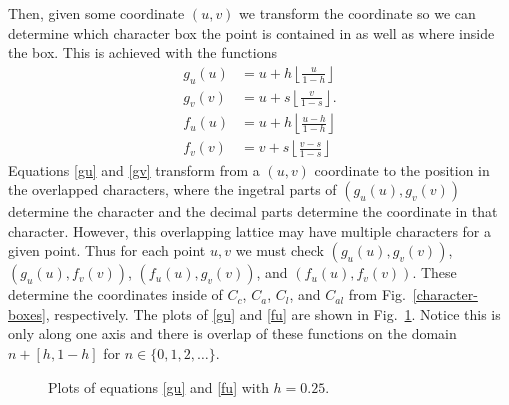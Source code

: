 \documentclass[12pt]{article}
\begin{document}
Then, given some coordinate $(u,v)$ we transform the coordinate so we can determine which character box the point is contained in as well as where inside the box. This is achieved with the functions
\begin{align}
	g_u(u) &= u + h \left\lfloor \frac{u}{1-h} \right\rfloor \label{gu} \\
	g_v(v) &= u + s \left\lfloor \frac{v}{1-s} \right\rfloor. \label{gv} \\
	f_u(u) &= u + h \left\lfloor \frac{u - h}{1-h} \right\rfloor \label{fu} \\
	f_v(v) &= v + s \left\lfloor \frac{v - s}{1-s} \right\rfloor \label{fv}
\end{align}
Equations \eqref{gu} and \eqref{gv} transform from a $(u,v)$ coordinate to the position in the overlapped characters, where the ingetral parts of $(g_u(u), g_v(v))$ determine the character and the decimal parts determine the coordinate in that character. However, this overlapping lattice may have multiple characters for a given point. Thus for each point $u,v$ we must check $(g_u(u), g_v(v))$, $(g_u(u), f_v(v))$, $(f_u(u), g_v(v))$, and $(f_u(u), f_v(v))$. These determine the coordinates inside of $C_c$, $C_a$, $C_l$, and $C_{al}$ from Fig.~\ref{character-boxes}, respectively. The plots of \eqref{gu} and \eqref{fu} are shown in Fig.~\ref{transformplot}. Notice this is only along one axis and there is overlap of these functions on the domain $n + [h, 1-h]$ for $n \in \{0, 1, 2, \dots \}$.

\begin{figure}[ht]
\centering
{}
\caption{Plots of equations \eqref{gu} and \eqref{fu} with $h = 0.25$.}
\label{transformplot}
\end{figure}
\end{document}
